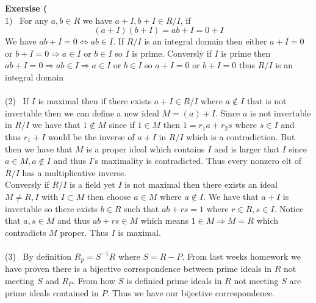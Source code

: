 \documentclass[12pt]{article}
\newenvironment{ques}[1]{\textbf{Exersise #1}\vspace{1 mm}\\ }{\bigskip}
\theoremstyle{definition}
\begin{document}
\begin{ques}{5.3}
	(1) \ For any $a,b \in R$ we have $a + I, b + I \in R/I$, if
	$$(a + I)(b + I) = ab + I = 0 + I$$
	We have $ab + I = 0 \Leftrightarrow ab \in I$. If $R/I$ is an integral domain then
	either $a + I = 0$ or $b + I = 0 \Rightarrow a \in I$ or $b \in I$ so $I$
	is prime. Conversly if $I$ is prime then $ab + I = 0 \Rightarrow ab \in I
	\Rightarrow a\in I$ or $b \in I$ so $a + I =0$ or $b + I = 0$ thus $R/I$ is
	an integral domain\\
	\\
	(2) \ If $I$ is maximal then if there exists $a + I \in R/I$ where $a
	\notin I$ that is not invertable then we can define a new ideal $M = (a) +
	I$. Since $a$ is not invertable in $R/I$ we have that $1 \notin M$ since if
	$1 \in M$ then $1 = r_1a + r_2s$ where $s \in I$ and thus $r_1 + I$ would be
	the inverse of $a + I$ in $R/I$ which is a contradiction. But then we have
	that $M$ is a proper ideal which contains $I$ and is larger that $I$ since
	$a \in M, a \notin I$ and thus $I$'s maximality is contradicted. Thus every
	nonzero elt of $R/I$ has a multiplicative inverse.\\
	Conversly if $R/I$ is a field yet $I$ is not maximal then there exists an
	ideal $M \neq R, I$ with $I \subset M$ then choose $a \in M$ where $a
	\notin I$. We have that $a + I$ is invertable so there exists $b \in R$
	such that $ab + rs = 1$ where $r \in R, s \in I$. Notice that $a, s \in M$
	and thus $ab + rs \in M$ which means $1 \in M \Rightarrow M = R$ which
	contradicts $M$ proper. Thus $I$ is maximal.\\
	\\
	(3) \ By definition $R_p = S^{-1}R$ where $S = R - P$. From last weeks
	homework we have proven there is a bijective correspondence between prime
	ideals in $R$ not meeting $S$ and $R_P$. From how $S$ is definied prime
	ideals in $R$ not meeting $S$ are prime ideals contained in $P$. Thus we
	have our bijective correspondence.
\end{ques}
\end{document}
